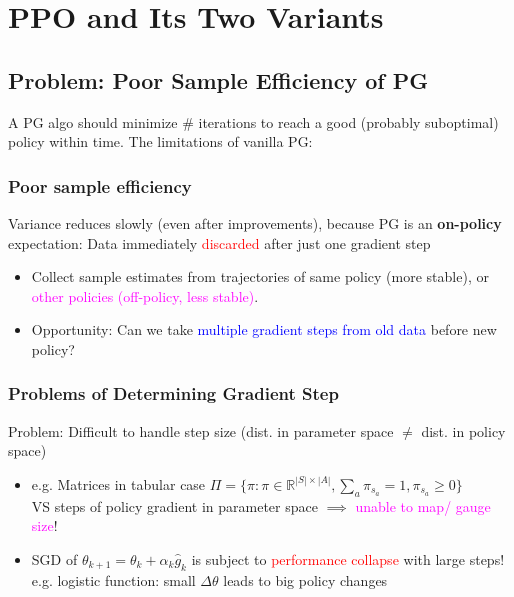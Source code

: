 \documentclass{article}
\begin{document}
\section{PPO and Its Two Variants}
    \subsection{Problem: Poor Sample Efficiency of PG}
    A PG algo should minimize \# iterations to reach a good (probably suboptimal) policy within time. The limitations of vanilla PG:
    \subsubsection{Poor sample efficiency}
    Variance reduces slowly (even after improvements), because PG is an \textbf{on-policy} expectation: Data immediately \textcolor{red}{discarded} after just one gradient step
    \begin{itemize}
    \item Collect sample estimates from trajectories of same policy (more stable), or \textcolor{magenta}{other policies (off-policy, less stable)}.
    \item Opportunity: Can we take \textcolor{blue}{multiple gradient steps from old data} before new policy?
    \end{itemize}

    \begin{defbox}
        \subsubsection*{Problems of Determining Gradient Step}
        Problem: Difficult to handle step size (dist. in parameter space $\neq$ dist. in policy space)
        \begin{itemize}
        \item e.g. Matrices in tabular case $\Pi = \{ \pi: \pi \in \mathbb{R}^{|S| \times |A|}, \sum_{a} \pi_{s_a} = 1, \pi_{s_a} \geq 0 \}$
            \\VS steps of policy gradient in parameter space $\implies$ \textcolor{magenta}{unable to map/ gauge size}!
        \item SGD of $\theta_{k+1} = \theta_{k} + \alpha_{k} \hat{g}_k$ is subject to \textcolor{red}{performance collapse} with large steps!
            \\e.g. logistic function: small $\Delta \theta$ leads to big policy changes
        \end{itemize}
    \end{defbox}
\end{document}
